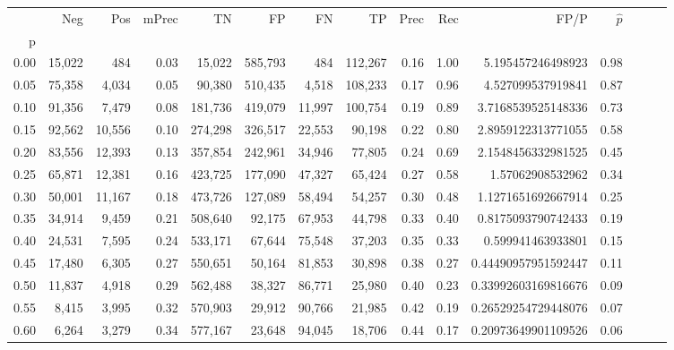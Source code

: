 \begin{tabular}{rrrrrrrrrrrrrrr}
\toprule
{} &     Neg &     Pos & mPrec &       TN &       FP &       FN &       TP &  Prec &   Rec &                  FP/P & $\hat{p}$ \\
p    &         &         &       &          &          &          &          &       &       &                       &           \\
\midrule
0.00 &  15,022 &     484 &  0.03 &   15,022 &  585,793 &      484 &  112,267 &  0.16 &  1.00 &     5.195457246498923 &      0.98 \\
0.05 &  75,358 &   4,034 &  0.05 &   90,380 &  510,435 &    4,518 &  108,233 &  0.17 &  0.96 &     4.527099537919841 &      0.87 \\
0.10 &  91,356 &   7,479 &  0.08 &  181,736 &  419,079 &   11,997 &  100,754 &  0.19 &  0.89 &    3.7168539525148336 &      0.73 \\
0.15 &  92,562 &  10,556 &  0.10 &  274,298 &  326,517 &   22,553 &   90,198 &  0.22 &  0.80 &    2.8959122313771055 &      0.58 \\
0.20 &  83,556 &  12,393 &  0.13 &  357,854 &  242,961 &   34,946 &   77,805 &  0.24 &  0.69 &    2.1548456332981525 &      0.45 \\
0.25 &  65,871 &  12,381 &  0.16 &  423,725 &  177,090 &   47,327 &   65,424 &  0.27 &  0.58 &      1.57062908532962 &      0.34 \\
0.30 &  50,001 &  11,167 &  0.18 &  473,726 &  127,089 &   58,494 &   54,257 &  0.30 &  0.48 &    1.1271651692667914 &      0.25 \\
0.35 &  34,914 &   9,459 &  0.21 &  508,640 &   92,175 &   67,953 &   44,798 &  0.33 &  0.40 &    0.8175093790742433 &      0.19 \\
0.40 &  24,531 &   7,595 &  0.24 &  533,171 &   67,644 &   75,548 &   37,203 &  0.35 &  0.33 &     0.599941463933801 &      0.15 \\
0.45 &  17,480 &   6,305 &  0.27 &  550,651 &   50,164 &   81,853 &   30,898 &  0.38 &  0.27 &   0.44490957951592447 &      0.11 \\
0.50 &  11,837 &   4,918 &  0.29 &  562,488 &   38,327 &   86,771 &   25,980 &  0.40 &  0.23 &   0.33992603169816676 &      0.09 \\
0.55 &   8,415 &   3,995 &  0.32 &  570,903 &   29,912 &   90,766 &   21,985 &  0.42 &  0.19 &   0.26529254729448076 &      0.07 \\
0.60 &   6,264 &   3,279 &  0.34 &  577,167 &   23,648 &   94,045 &   18,706 &  0.44 &  0.17 &   0.20973649901109526 &      0.06 \\

\end{tabular}
